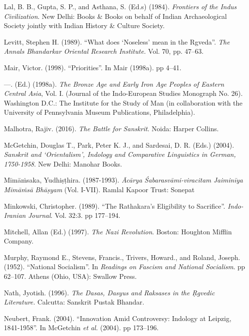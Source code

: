 \begin{thebibliography}{99}
  Lal, B. B., Gupta, S. P., and Asthana, S. (Ed.s) (1984).\textit{ Frontiers of the Indus Civilization}. New Delhi: Books \& Books on behalf of Indian Archaeological Society jointly with Indian History \& Culture Society.

  Levitt, Stephen H. (1989). “What does ‘Noseless’ mean in the Rgveda”. \textit{The Annals Bhandarkar Oriental Research Institute.} Vol. 70, pp. 47--63.

  Mair, Victor. (1998). “Priorities”. In Mair (1998a). pp 4--41.

  —. (Ed.) (1998a). \textit{The Bronze Age and Early Iron Age Peoples of Eastern Central Asia}, Vol. I. (Journal of the Indo-European Studies Monograph No. 26). Washington D.C.: The Institute for the Study of Man (in collaboration with the University of Pennsylvania Museum Publications, Philadelphia).

\newpage

  Malhotra, Rajiv. (2016). \textit{The Battle for Sanskrit}. Noida: Harper Collins.

  McGetchin, Douglas T., Park, Peter K. J., and Sardesai, D. R. (Eds.) (2004). \textit{Sanskrit and ‘Orientalism’, Indology and Comparative Linguistics in German, 1750-1958}. New Delhi: Manohar Books.

  Mīmāṁsaka, Yudhiṣṭhira. (1987-1993). \textit{Ācārya Śabarasvāmi-viracitam Jaiminīya Mīmāṁsā Bhāṣyam} (Vol. I-VII). Ramlal Kapoor Trust: Sonepat

  Minkowski, Christopher. (1989). “The Rathakara’s Eligibility to Sacrifice”. \textit{Indo-Iranian Journal}. Vol. 32:3. pp 177--194.

  Mitchell, Allan (Ed.) (1997). \textit{The Nazi Revolution}. Boston: Houghton Mifflin Company.

  Murphy, Raymond E., Stevens, Francis., Trivers, Howard., and Roland, Joseph. (1952). “National Socialism”. In \textit{Readings on Fascism and National Socialism}. pp 62--107. Athens (Ohio, USA): Swallow Press.

  Nath, Jyotish. (1996). \textit{The Dasas, Dasyus and Raksases in the Ṛgvedic Literature.} Calcutta: Sanskrit Pustak Bhandar.

  Neubert, Frank. (2004). “Innovation Amid Controversy: Indology at Leipzig, 1841-1958”. In McGetchin \textit{et al.} (2004). pp 173--196.


\end{thebibliography}
